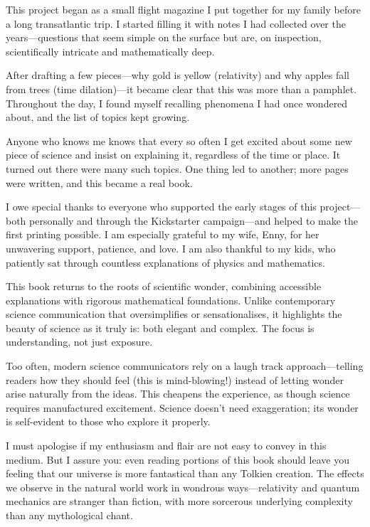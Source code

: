This project began as a small \QSOpen{}flight magazine\QSClose{} I put together for my family before a long transatlantic trip. I started filling it with notes I had collected over the years—questions that seem simple on the surface but are, on inspection, scientifically intricate and mathematically deep.

After drafting a few pieces—why gold is yellow (relativity) and why apples fall from trees (time dilation)—it became clear that this was more than a pamphlet. Throughout the day, I found myself recalling phenomena I had once wondered about, and the list of topics kept growing.

Anyone who knows me knows that every so often I get excited about some new piece of science and insist on explaining it, regardless of the time or place. It turned out there were many such topics. One thing led to another; more pages were written, and this became a real book.

I owe special thanks to everyone who supported the early stages of this project—both personally and through the Kickstarter campaign—and helped to make the first printing possible. I am especially grateful to my wife, Enny, for her unwavering support, patience, and love. I am also thankful to my kids, who patiently sat through countless explanations of physics and mathematics.

This book returns to the roots of scientific wonder, combining accessible explanations with rigorous mathematical foundations. Unlike contemporary science communication that oversimplifies or sensationalises, it highlights the beauty of science as it truly is: both elegant and complex. The focus is understanding, not just exposure.

Too often, modern science communicators rely on a \QSOpen{}laugh track\QSClose{} approach—telling readers how they should feel (\QSOpen{}this is mind-blowing!\QSClose{}) instead of letting wonder arise naturally from the ideas. This cheapens the experience, as though science requires manufactured excitement. Science doesn't need exaggeration; its wonder is self-evident to those who explore it properly.

I must apologise if my enthusiasm and flair are not easy to convey in this medium. But I assure you: even reading portions of this book should leave you feeling that our universe is more fantastical than any Tolkien creation. The effects we observe in the natural world work in wondrous ways—relativity and quantum mechanics are stranger than fiction, with more sorcerous underlying complexity than any mythological chant.

